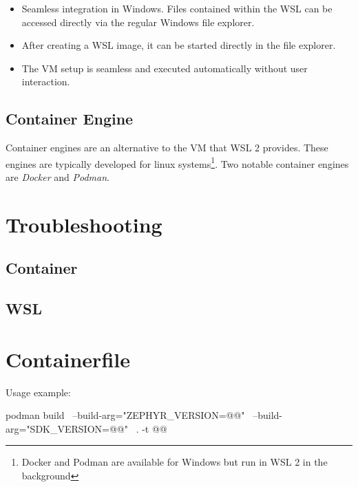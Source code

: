 \begin{itemize}
  \item Seamless integration in Windows.
    Files contained within the WSL can be accessed directly via the regular Windows file explorer.
  \item After creating a WSL image, it can be started directly in the file explorer.
  \item The VM setup is seamless and executed automatically without user
    interaction.
\end{itemize}

\subsection{Container Engine}
Container engines are an alternative to the VM that WSL 2 provides.
These engines are typically developed for linux systems\footnote{Docker and Podman are available for Windows but run in WSL 2 in the background}.
Two notable container engines are \emph{Docker} and \emph{Podman}.

\newpage



\newpage



\newpage


\newpage


\newpage

\appendix



\section{Troubleshooting}



\subsection{Container}



\subsection{WSL}



\newpage
{}
\fancyfoot{}

\section{Containerfile}\label{containerfile}



Usage example:

\begin{monobox}
podman build \
  --build-arg="ZEPHYR_VERSION=@\zephyrversion{}@" \
  --build-arg="SDK_VERSION=@\sdkversion{}@" \
  . -t @\imagename{}@
\end{monobox}


